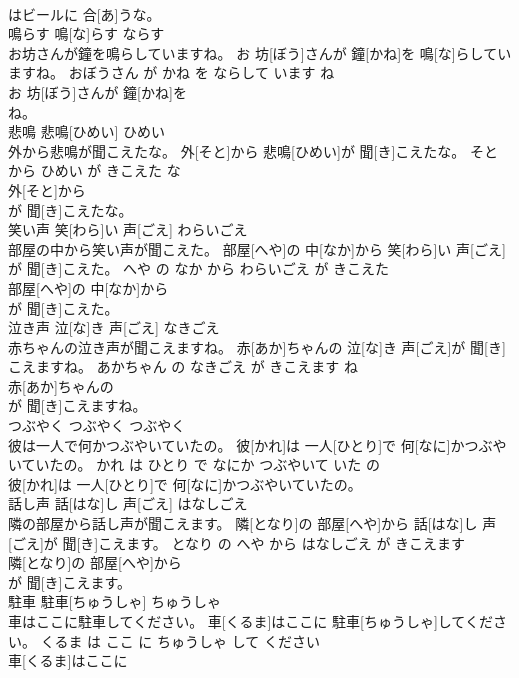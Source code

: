 \documentclass[8pt]{extreport}
\begin{document}
\begin{CJK}{UTF8}{min}
\\	はビールに 合[あ]うな。			
\\	鳴らす	鳴[な]らす	ならす	
\\	お坊さんが鐘を鳴らしていますね。	お 坊[ぼう]さんが 鐘[かね]を 鳴[な]らしていますね。	おぼうさん が かね を ならして います ね	
\\	お 坊[ぼう]さんが 鐘[かね]を
\\	ね。			
\\	悲鳴	悲鳴[ひめい]	ひめい	
\\	外から悲鳴が聞こえたな。	外[そと]から 悲鳴[ひめい]が 聞[き]こえたな。	そと から ひめい が きこえた な	
\\	外[そと]から
\\	が 聞[き]こえたな。			
\\	笑い声	笑[わら]い 声[ごえ]	わらいごえ	
\\	部屋の中から笑い声が聞こえた。	部屋[へや]の 中[なか]から 笑[わら]い 声[ごえ]が 聞[き]こえた。	へや の なか から わらいごえ が きこえた	
\\	部屋[へや]の 中[なか]から
\\	が 聞[き]こえた。			
\\	泣き声	泣[な]き 声[ごえ]	なきごえ	
\\	赤ちゃんの泣き声が聞こえますね。	赤[あか]ちゃんの 泣[な]き 声[ごえ]が 聞[き]こえますね。	あかちゃん の なきごえ が きこえます ね	
\\	赤[あか]ちゃんの
\\	が 聞[き]こえますね。			
\\	つぶやく	つぶやく	つぶやく	
\\	彼は一人で何かつぶやいていたの。	彼[かれ]は 一人[ひとり]で 何[なに]かつぶやいていたの。	かれ は ひとり で なにか つぶやいて いた の	
\\	彼[かれ]は 一人[ひとり]で 何[なに]かつぶやいていたの。			
\\	話し声	話[はな]し 声[ごえ]	はなしごえ	
\\	隣の部屋から話し声が聞こえます。	隣[となり]の 部屋[へや]から 話[はな]し 声[ごえ]が 聞[き]こえます。	となり の へや から はなしごえ が きこえます	
\\	隣[となり]の 部屋[へや]から
\\	が 聞[き]こえます。			
\\	駐車	駐車[ちゅうしゃ]	ちゅうしゃ	
\\	車はここに駐車してください。	車[くるま]はここに 駐車[ちゅうしゃ]してください。	くるま は ここ に ちゅうしゃ して ください	
\\	車[くるま]はここに

\end{CJK}
\end{document}
